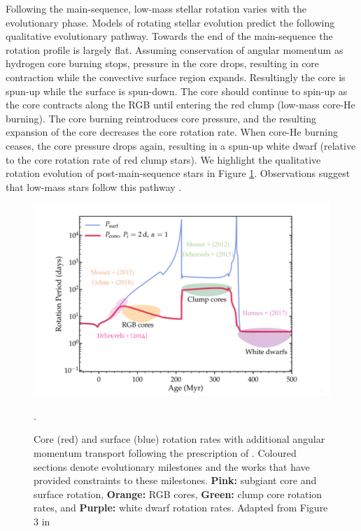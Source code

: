 Following the main-sequence, low-mass stellar rotation varies with the evolutionary phase.
Models of rotating stellar evolution \citep[see, e.g.,][]{maeder_evolution_2000,heger_presupernova_2000} predict the following qualitative evolutionary pathway.
Towards the end of the main-sequence the rotation profile is largely flat.
Assuming conservation of angular momentum as hydrogen core burning stops, pressure in the core drops, resulting in core contraction while the convective surface region expands.
Resultingly the core is spun-up while the surface is spun-down.
The core should continue to spin-up as the core contracts along the RGB until entering the red clump (low-mass core-He burning).
The core burning reintroduces core pressure, and the resulting expansion of the core decreases the core rotation rate.
When core-He burning ceases, the core pressure drops again, resulting in a spun-up white dwarf (relative to the core rotation rate of red clump stars).
We highlight the qualitative rotation evolution of post-main-sequence stars in Figure \ref{fig:poms_evo}.
Observations suggest that low-mass stars follow this pathway \citep{mosser_spin_2012,deheuvels_seismic_2014,deheuvels_seismic_2015,hermes_white_2017,gehan_core_2018,deheuvels_seismic_2020}.

\begin{figure}[h]
    \includegraphics[width=\textwidth]{Figures/intro_figures/qualitative_evo.png}
    \caption[Qualitative core and surface rotation rates of post-main-sequence stars.]{Core (red) and surface (blue) rotation rates with additional angular momentum transport following the prescription of \citet{spada_angular_2016}. Coloured sections denote evolutionary milestones and the works that have provided constraints to these milestones. \textbf{Pink:} subgiant core and surface rotation, \textbf{Orange:} RGB cores, \textbf{Green:} clump core rotation rates, and \textbf{Purple:} white dwarf rotation rates. Adapted from Figure 3 in \citet{fuller_slowing_2019}}.
    \label{fig:poms_evo}
\end{figure}


